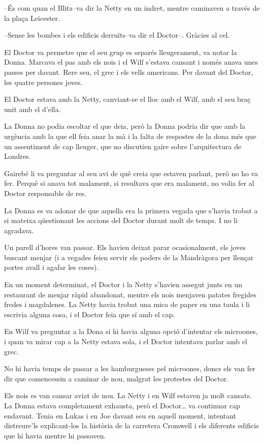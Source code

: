 --És com quan el Blitz--va dir la Netty en un indret, mentre caminaven a
través de la plaça Leicester.

--Sense les bombes i els edificis derruïts--va dir el Doctor--. Gràcies
al cel.

El Doctor va permetre que el seu grup es separés lleugerament, va notar
la Donna. Marcava el pas amb els nois i el Wilf s'estava cansant i només
anava unes passes per davant. Rere seu, el grec i els vells americans.
Per davant del Doctor, les quatre persones joves.

El Doctor estava amb la Netty, canviant-se el lloc amb el Wilf, amb el
seu braç unit amb el d'ella.

La Donna no podia escoltar el que deia, però la Donna podria dir que amb
la urgència amb la que ell feia anar la mà i la falta de respostes de la
dona més que un assentiment de cap lleuger, que no discutien gaire sobre
l'arquitectura de Londres.

Gairebé li va preguntar al seu avi de què creia que estaven parlant,
però no ho va fer. Perquè si anava tot malament, si resultava que era
malament, no volia fer al Doctor responsable de res.

La Donna es va adonar de que aquella era la primera vegada que s'havia
trobat a si mateixa qüestionant les accions del Doctor durant molt de
temps. I no li agradava.

Un parell d'hores van passar. Els havien deixat parar ocasionalment, els
joves buscant menjar (i a vegades feien servir els poders de la
Mandràgora per llençar portes avall i agafar les coses).

En un moment determinat, el Doctor i la Netty s'havien assegut junts en
un restaurant de menjar ràpid abandonat, mentre els nois menjaven
patates fregides fredes i magdalenes. La Netty havia trobat una mica de
paper en una taula i li escrivia alguna cosa, i el Doctor feia que sí
amb el cap.

En Wilf va preguntar a la Dona si hi havia alguna opció d'intentar els
microones, i quan va mirar cap a la Netty estava sola, i el Doctor
intentava parlar amb el grec.

No hi havia temps de passar a les hamburgueses pel microones, doncs els
van fer dir que comencessin a caminar de nou, malgrat les protestes del
Doctor.

Els nois es van cansar aviat de nou. La Netty i en Wilf estaven ja molt
cansats. La Donna estava completament exhausta, però el Doctor\ldots{}
va continuar cap endavant. Tenia en Lukas i en Joe davant seu en aquell
moment, intentant distreure'ls explicant-los la història de la carretera
Cromwell i els diferents edificis que hi havia mentre hi passaven.

